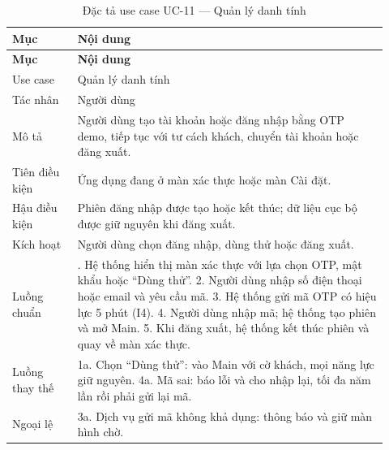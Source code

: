 \begingroup\small\renewcommand{\arraystretch}{1.15}\setlength{\tabcolsep}{3pt}
\begin{longtable}{>{\RaggedRight\arraybackslash}p{0.16\linewidth}>{\RaggedRight\arraybackslash}p{0.76\linewidth}}
\caption{Đặc tả use case UC-11 --- Quản lý danh tính}
\label{tab:spec-uc-11}\\
\toprule
\textbf{Mục} & \textbf{Nội dung} \\
\midrule
\endfirsthead
\toprule
\textbf{Mục} & \textbf{Nội dung} \\
\midrule
\endhead
\bottomrule
\endfoot
Use case & Quản lý danh tính \\
Tác nhân & Người dùng \\
Mô tả & Người dùng tạo tài khoản hoặc đăng nhập bằng OTP demo, tiếp tục với tư cách khách, chuyển tài khoản hoặc đăng xuất. \\
Tiên điều kiện & Ứng dụng đang ở màn xác thực hoặc màn Cài đặt. \\
Hậu điều kiện & Phiên đăng nhập được tạo hoặc kết thúc; dữ liệu cục bộ được giữ nguyên khi đăng xuất. \\
Kích hoạt & Người dùng chọn đăng nhập, dùng thử hoặc đăng xuất. \\
Luồng chuẩn & 1. Hệ thống hiển thị màn xác thực với lựa chọn OTP, mật khẩu hoặc “Dùng thử”. 2. Người dùng nhập số điện thoại hoặc email và yêu cầu mã. 3. Hệ thống gửi mã OTP có hiệu lực 5 phút (I4). 4. Người dùng nhập mã; hệ thống tạo phiên và mở Main. 5. Khi đăng xuất, hệ thống kết thúc phiên và quay về màn xác thực. \\
Luồng thay thế & 1a. Chọn “Dùng thử”: vào Main với cờ khách, mọi năng lực giữ nguyên. 4a. Mã sai: báo lỗi và cho nhập lại, tối đa năm lần rồi phải gửi lại mã. \\
Ngoại lệ & 3a. Dịch vụ gửi mã không khả dụng: thông báo và giữ màn hình chờ. \\
\end{longtable}
\endgroup

